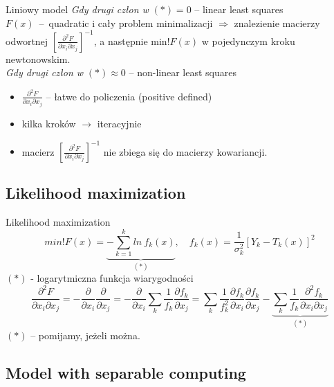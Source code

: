   \begin{frame}{Liniowy model}
    \emph{Gdy drugi człon w} $(*) = 0$ --
    linear least squares\\
    $F(x)$~--~quadratic i cały problem minimalizacji $\Rightarrow$ znalezienie macierzy odwortnej $\left[ \frac{\partial^2 F}{\partial x_{i} \partial x_{j}} \right]^{-1}$,
    a następnie min!$F(x)$ w pojedynczym kroku newtonowskim.\\
    \emph{Gdy drugi człon w} $(*) \approx 0$ -- non-linear least squares\\
    \begin{itemize}
      \item $\frac{\partial^2 F}{\partial x_{i} \partial x_{j}}$
      -- łatwe do policzenia (positive defined) %
      \item kilka kroków $\to$ iteracyjnie
      \item macierz $\left[ \frac{\partial^2 F}{\partial x_{i} \partial x_{j}} \right]^{-1}$
      nie zbiega się do macierzy kowariancji.
    \end{itemize}
  \end{frame}

\subsection{Likelihood maximization}
  \begin{frame}{Likelihood maximization}
    \begin{equation}
      min!F(x) = \underbrace{- \sum_{k=1}^{k} ln\ f_{k}(x)}_{(*)}{,} \quad
      f_{k}(x) = \frac{1}{\sigma^{2}_{k}} \left[ Y_{k} - T_{k}(x) \right]^2
      \nonumber
    \end{equation}
    $(*)$ - logarytmiczna funkcja wiarygodności
    \begin{equation}
      \frac{\partial^2 F}{\partial x_{i} \partial x_{j}} =
      - \frac{\partial}{\partial x_{i}}\frac{\partial}{\partial x_{j}} =
      - \frac{\partial}{\partial x_{i}}
      \sum_{k} \frac{1}{f_{k}} \frac{\partial f_{k}}{\partial x_{j}} =
      \sum_{k} \frac{1}{f^{2}_{k}} \frac{\partial f_{k}}{\partial x_{i}} \frac{\partial f_{k}}{\partial x_{j}} -
      \underbrace{\sum_{k} \frac{1}{f_{k}} \frac{\partial^{2} f_{k}}{\partial x_{i} \partial x_{j}}}_{(*)}
      \nonumber
    \end{equation}
    $(*)$ -- pomijamy, jeżeli można.
  \end{frame}

\subsection{Model with separable computing}


